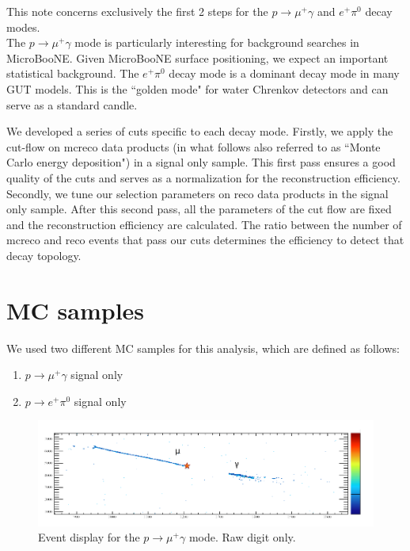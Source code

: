 \documentclass[a4paper, 10pt]{article}
\begin{document}
This note concerns exclusively the first 2 steps for the $p \rightarrow \mu^{+} \gamma$ and $e^{+} \pi^{0}$  decay modes. \\
The   $p \rightarrow \mu^{+} \gamma$  mode is particularly interesting for background searches in MicroBooNE. Given MicroBooNE surface positioning, we expect an important statistical background. The  $e^{+} \pi^{0}$ decay mode is a dominant decay mode in many GUT models. This is the ``golden mode" for water Chrenkov detectors and can serve as a standard candle.

We developed a series of cuts specific to each decay mode. Firstly, we apply the cut-flow on  mcreco data products (in what follows also referred to as ``Monte Carlo energy deposition") in a signal only sample.  This first pass ensures a good quality of the cuts and serves as a normalization for the reconstruction efficiency. Secondly, we tune our selection parameters on reco data products in the signal only sample.  After this second pass, all the parameters of the cut flow are fixed and the reconstruction efficiency are calculated. The ratio between the number of mcreco and reco events  that pass our cuts determines the efficiency to detect that decay topology.\\


\section{MC samples}
We used two different MC samples for this analysis, which are defined as follows:
\begin{enumerate}[topsep=10pt,itemsep=-1ex,partopsep=10pt,parsep=1ex]
\item $p \rightarrow \mu^{+} \gamma$  signal only
\item  $p \rightarrow e^{+} \pi^{0}$ signal only
\end{enumerate}




\begin{figure}[p!]
\centering
\includegraphics[width=6in]{evd/mu1}
\caption{Event display for the $p \rightarrow \mu^{+} \gamma$ mode. Raw digit only. \\}
\label{mu}
\end{figure}
\end{document}
